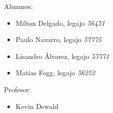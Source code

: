 \subtitle{Circuitos l\'ogicos, almacenamiento, multivibradores y contadores}

Alumnos:
\begin{itemize}  
\item Milton Delgado, legajo \textit{56451}
\item Paulo Navarro, legajo \textit{57775}
\item Lisandro \'Alvarez, legajo \textit{57771}
\item Mat\'ias Fogg, legajo \textit{56252}
\end{itemize}

Profesor:
\begin{itemize}  
\item Kevin Dewald
\end{itemize}